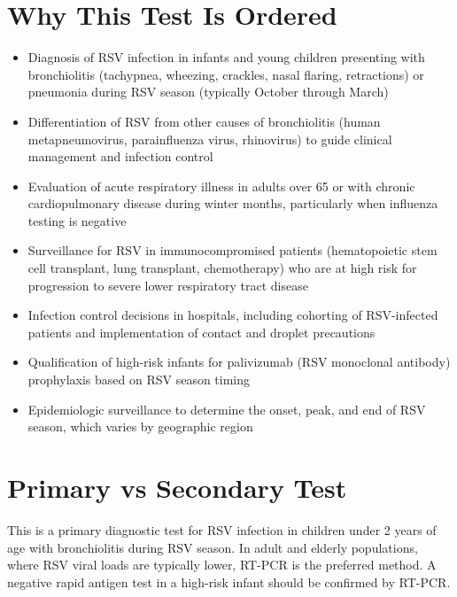 \section*{Why This Test Is Ordered}
\begin{itemize}
  \item Diagnosis of RSV infection in infants and young children presenting with bronchiolitis (tachypnea, wheezing, crackles, nasal flaring, retractions) or pneumonia during RSV season (typically October through March) \cite{aap2014bronchiolitis}
  \item Differentiation of RSV from other causes of bronchiolitis (human metapneumovirus, parainfluenza virus, rhinovirus) to guide clinical management and infection control
  \item Evaluation of acute respiratory illness in adults over 65 or with chronic cardiopulmonary disease during winter months, particularly when influenza testing is negative
  \item Surveillance for RSV in immunocompromised patients (hematopoietic stem cell transplant, lung transplant, chemotherapy) who are at high risk for progression to severe lower respiratory tract disease
  \item Infection control decisions in hospitals, including cohorting of RSV-infected patients and implementation of contact and droplet precautions
  \item Qualification of high-risk infants for palivizumab (RSV monoclonal antibody) prophylaxis based on RSV season timing
  \item Epidemiologic surveillance to determine the onset, peak, and end of RSV season, which varies by geographic region
\end{itemize}

\section*{Primary vs Secondary Test}
This is a primary diagnostic test for RSV infection in children under 2 years of age with bronchiolitis during RSV season. In adult and elderly populations, where RSV viral loads are typically lower, RT-PCR is the preferred method. A negative rapid antigen test in a high-risk infant should be confirmed by RT-PCR.

